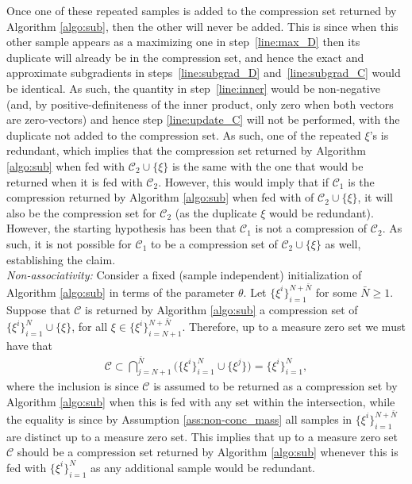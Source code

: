 \begin{enumerate}[wide, labelwidth=!, labelindent=0pt]
          Once one of these repeated samples is added to the compression set returned by Algorithm \ref{algo:sub}, then the other will never be added. This is since when this other sample appears as a maximizing one in step~\ref{line:max_D} then its duplicate will already be in the compression set, and hence the exact and approximate subgradients in steps~\ref{line:subgrad_D} and~\ref{line:subgrad_C} would be identical. 
          As such, the quantity in step~\ref{line:inner} would be non-negative (and, by positive-definiteness of the inner product, only zero when both vectors are zero-vectors) and hence step \ref{line:update_C} will not be performed, with the duplicate not added to the compression set. 
          As such, one of the repeated $\xi$'s is redundant, which implies that the compression set returned by Algorithm \ref{algo:sub} when fed with $\mathcal{C}_2 \cup \{\xi\}$ is the same with the one that would be returned when it is fed with $\mathcal{C}_2$. 
          However, this would imply that if $\mathcal{C}_1$ is the compression returned by Algorithm \ref{algo:sub} when fed with of $\mathcal{C}_2 \cup \{\xi\}$, it will also be the compression set for $\mathcal{C}_2$ (as the duplicate $\xi$ would be redundant). 
          However, the starting hypothesis has been that $\mathcal{C}_1$ is not a compression of $\mathcal{C}_2$. As such, it is not possible for $\mathcal{C}_1$ to be a compression set of $\mathcal{C}_2 \cup \{\xi\}$ as well, establishing the claim.\\
          
\emph{Non-associativity:} Consider a fixed (sample independent) initialization of Algorithm \ref{algo:sub} in terms of the parameter $\theta$. Let $\{\xi^i\}_{i=1}^{N+\bar{N}}$ for some $\bar{N} \geq 1$.
        Suppose that $\mathcal{C}$ is returned by Algorithm \ref{algo:sub} a compression set of $\{\xi^i\}_{i=1}^{N} \cup \{\xi\}$, for all $\xi \in \{\xi^i\}_{i=N+1}^{N+\bar{N}}$. 
        Therefore, up to a measure zero set we must have that
        \begin{align}
        \mathcal{C} \subset \bigcap_{j=N+1}^{\bar{N}}
       \Big ( \{\xi^i\}_{i=1}^N \cup \{\xi^j\} \Big ) = \{\xi^i\}_{i=1}^N, \label{eq:proof_nonassoc}
        \end{align}
where the inclusion is since $\mathcal{C}$ is assumed to be returned as a compression set by Algorithm \ref{algo:sub} when this is fed with any set within the intersection, while the equality is since by Assumption \ref{ass:non-conc_mass} all samples in $\{\xi^i\}_{i=1}^{N+\bar{N}}$ are distinct up to a measure zero set. This implies that up to a measure zero set $\mathcal{C}$ should be a compression set returned by Algorithm \ref{algo:sub} whenever this is fed with $\{\xi^i\}_{i=1}^N$ as any additional sample would be redundant.


\end{enumerate}
